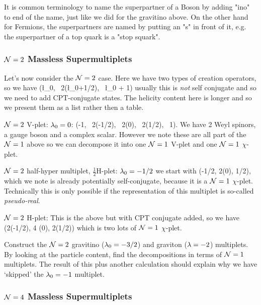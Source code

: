 \bter 
    It is common terminology to name the superpartner of a Boson by adding "ino" to end of the name, just like we did for the gravitino above. On the other hand for Fermions, the superpartners are named by putting an "s" in front of it, e.g. the superpartner of a top quark is a "stop squark". 
\eter 

\subsubsection{$\mathcal{N}=2$ Massless Supermultiplets}

Let's now consider the $\mathcal{N}=2$ case. Here we have two types of creation operators, so we have 
\bse 
    (\l_0, \, 2\times (\l_0+1/2), \, \l_0 + 1)
\ese 
usually this is \textit{not} self conjugate and so we need to add CPT-conjugate states. The helicity content here is longer and so we present them as a list rather then a table. 
\ben[label=(\roman*)] 
    \item $\mathcal{N}=2$ V-plet: $\lambda_0=0$:
    \bse 
        (-1, \, 2\times (-1/2), \, 2\times(0), \, 2\times(1/2), \, 1).
    \ese 
    We have 2 Weyl spinors, a gauge boson and a complex scalar. However we note these are all part of the $\mathcal{N}=1$ above so we can decompose it into one $\mathcal{N}=1$ V-plet and one $\mathcal{N}=1$ $\chi$-plet.
    \item $\mathcal{N}=2$ half-hyper multiplet, $\frac{1}{2}$H-plet: $\lambda_0=-1/2$ we start with
    \bse 
        (-1/2, 2\times(0), 1/2),
    \ese
    which we note is already potentially self-conjugate, because it is a $\mathcal{N}=1$ $\chi$-plet. Technically this is only possible if the representation of this multiplet is so-called \textit{pseudo-real}.
    \item $\mathcal{N}=2$ H-plet: This is the above but with CPT conjugate added, so we have 
    \bse 
        (2\times(-1/2), 4 \times(0), 2\times (1/2))
    \ese 
    which is two lots of $\mathcal{N}=1$ $\chi$-plet.
\een 

\bbox 
    Construct the $\mathcal{N}=2$ gravitino ($\lambda_0=-3/2$) and graviton ($\lambda=-2$) multiplets. By looking at the particle content, find the decompositions in terms of $\mathcal{N}=1$ multiplets. 
    \br 
        The result of this plus another calculation should explain why we have `skipped' the $\lambda_0=-1$ multiplet. 
    \er 
\ebox 

\subsubsection{$\mathcal{N}=4$ Massless Supermultiplets}

